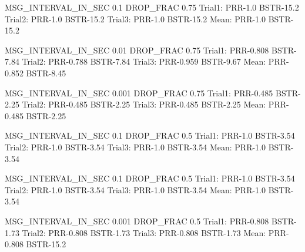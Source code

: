 MSG_INTERVAL_IN_SEC 0.1 DROP_FRAC 0.75
Trial1: PRR-1.0 BSTR-15.2
Trial2: PRR-1.0 BSTR-15.2
Trial3: PRR-1.0 BSTR-15.2
Mean:   PRR-1.0 BSTR-15.2

MSG_INTERVAL_IN_SEC 0.01 DROP_FRAC 0.75
Trial1: PRR-0.808 BSTR-7.84
Trial2: PRR-0.788 BSTR-7.84
Trial3: PRR-0.959 BSTR-9.67
Mean:   PRR-0.852 BSTR-8.45

MSG_INTERVAL_IN_SEC 0.001 DROP_FRAC 0.75
Trial1: PRR-0.485 BSTR-2.25
Trial2: PRR-0.485 BSTR-2.25
Trial3: PRR-0.485 BSTR-2.25
Mean:   PRR-0.485 BSTR-2.25

MSG_INTERVAL_IN_SEC 0.1 DROP_FRAC 0.5
Trial1: PRR-1.0 BSTR-3.54
Trial2: PRR-1.0 BSTR-3.54
Trial3: PRR-1.0 BSTR-3.54
Mean:   PRR-1.0 BSTR-3.54

MSG_INTERVAL_IN_SEC 0.1 DROP_FRAC 0.5
Trial1: PRR-1.0 BSTR-3.54
Trial2: PRR-1.0 BSTR-3.54
Trial3: PRR-1.0 BSTR-3.54
Mean:   PRR-1.0 BSTR-3.54

MSG_INTERVAL_IN_SEC 0.001 DROP_FRAC 0.5
Trial1: PRR-0.808 BSTR-1.73
Trial2: PRR-0.808 BSTR-1.73
Trial3: PRR-0.808 BSTR-1.73
Mean:   PRR-0.808 BSTR-15.2
